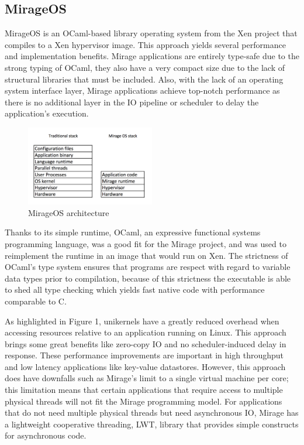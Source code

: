 \documentclass[english,10pt,twocolumn]{article}
\begin{document}
\subsection{MirageOS}

MirageOS is an OCaml-based library operating system from the Xen project that compiles to a Xen hypervisor image.
This approach yields several performance and implementation benefits.
Mirage applications are entirely type-safe due to the strong typing of OCaml, they also have a very compact size due to the lack of structural libraries that must be included.
Also, with the lack of an operating system interface layer, Mirage applications achieve top-notch performance as there is no additional layer in the IO pipeline or scheduler to delay the application's execution.

\begin{figure}[ht]
  \centering
  \caption{MirageOS architecture}
  \includegraphics[width=0.5\textwidth]{images/design}
\end{figure}

Thanks to its simple runtime, OCaml, an expressive functional systems programming language, was a good fit for the Mirage project, and was used to re\-implement the runtime in an image that would run on Xen.
The strictness of OCaml's type system ensures that programs are respect with regard to variable data types prior to compilation, because of this strictness the executable is able to shed all type checking which yields fast native code with performance comparable to C.

As highlighted in Figure 1, unikernels have a greatly reduced overhead when accessing resources relative to an application running on Linux.
This approach brings some great benefits like zero-copy IO and no scheduler-induced delay in response.
These performance improvements are important in high throughput and low latency applications like key-value datastores.
However, this approach does have downfalls such as Mirage's limit to a single virtual machine per core; this limitation means that certain applications that require access to multiple physical threads will not fit the Mirage programming model.
For applications that do not need multiple physical threads but need asynchronous IO, Mirage has a lightweight cooperative threading, LWT, library that provides simple constructs for asynchronous code.
\end{document}
